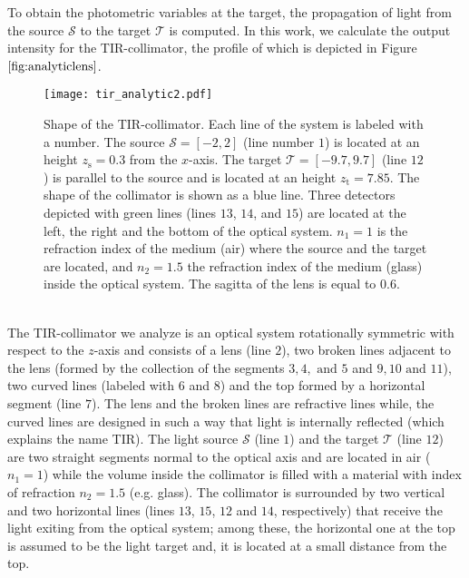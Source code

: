 To obtain the photometric variables at the target, the propagation of light from the source $\mathcal{S}$ to the target $\mathcal{T}$ is computed.
In this work, we calculate the output intensity for the TIR-collimator, the profile of which is depicted in Figure $\ref{fig:analyticlens}$.
\begin{figure}[t]
  \begin{center}
  \texttt{[image: tir\_analytic2.pdf]}
   \end{center}
    \caption{\footnotesize{Shape of the TIR-collimator. Each line of the system is labeled with a number.
       The source $\mathcal{S}= [-2,2]$ (line number $1$) is located at an height $z_{\textrm{s}} = 0.3$ from the $x$-axis.
       The target $\mathcal{T}= [-9.7, 9.7]$ (line $12$) is parallel to the source and is located at an height $ z_{\textrm{t}}= 7.85$.
       The shape of the collimator is shown as a blue line.
       Three detectors depicted with green lines (lines $13$, $14$, and $15$) are located at the left, the right and the bottom of the optical system.
       $n_1 = 1$ is the refraction index of the medium (air) where the source and the target are located, and
       $n_2 = 1.5 $ the refraction index of the medium (glass) inside the optical system. The sagitta of the lens is equal to $0.6$.}}
 \label{fig:analyticlens}
\end{figure}
\\
The TIR-collimator we analyze is an optical system rotationally symmetric with respect to the $z$-axis and consists of a lens (line $2$), two broken lines adjacent to the lens (formed by the collection of the segments $3, 4, \mbox{ and } 5$ and $9, 10 \mbox{ and } 11$),
two curved lines (labeled with $6$ and $8$) and the top formed by a horizontal segment (line $7$). The lens and the broken lines are refractive lines while, the curved lines are designed in such a way that light is internally reflected (which explains the name TIR).
The light source $\mathcal{S}$ (line $1$) and the target $\mathcal{T}$ (line $12$) are two straight segments normal to the optical axis and are located in air ($n_1=1$) while
the volume inside the collimator is filled with a material with index of refraction $n_2=1.5$ (e.g. glass).
The collimator is surrounded by two vertical and two horizontal lines (lines $13$, $15$, $12$ and $14$, respectively) that receive the light exiting from the optical system; among these, the horizontal one at the top is assumed to be the light target and, it is located at a small distance from the top. \\
